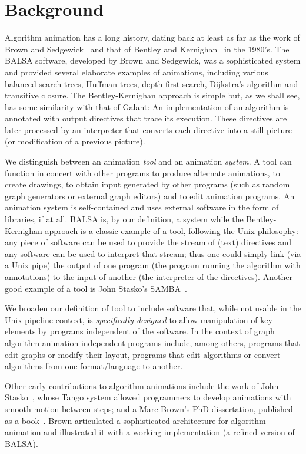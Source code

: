 \section{Background}\label{sec:background}

Algorithm animation has a long history, dating back at least as far as the
work of Brown and Sedgewick~\cite{1985-IEEE_Software-Brown,1988-Computer-Brown} and that of Bentley and Kernighan~\cite{1987-Animation-Bentley} in the 1980's.
The BALSA software, developed by Brown and Sedgewick, was a sophisticated system and provided several
elaborate examples of animations, including various balanced search trees,
Huffman trees, depth-first search, Dijkstra's algorithm and transitive closure.
The Bentley-Kernighan approach is simple but, as we shall see, has some similarity with that
of Galant: An implementation of an algorithm is annotated with output directives that trace its execution.
These directives are later processed by an interpreter that
converts each directive into a still picture (or modification of a previous
picture).

We distinguish between an animation \emph{tool}
and an animation \emph{system}.
A tool can function in concert with other programs to produce
alternate animations, to create drawings, to obtain input generated by other
programs (such as random graph generators or external graph editors) and to
edit animation programs.
An animation system is
self-contained and uses external software in the form of libraries, if at all.
BALSA is, by our definition, a system while the Bentley-Kernighan approach is a classic example of a tool, following the
Unix philosophy:
any piece of software can be used to provide the stream of (text) directives and any
software can be used to interpret that stream;
thus one could simply link (via a Unix pipe) the output of one program
(the program running the algorithm with annotations) to the
input of another (the interpreter of the directives).
Another good example of a tool is John Stasko's SAMBA~\cite{SAMBA}.

We broaden our definition of tool to include software that, while not usable
in the Unix pipeline context, is \emph{specifically designed} to allow manipulation
of key elements by programs independent of the software.
In the context of graph algorithm animation independent programs include,
among others, programs that edit graphs or modify their layout, programs that edit
algorithms or convert algorithms from one format/language to another. 

Other early contributions to algorithm animations include the work of
John Stasko~\cite{1990-Computer-Stasko}, whose Tango system allowed programmers to
develop animations with smooth motion between steps;
and a Marc Brown's PhD dissertation, published as a book~\cite{1988-Animation-Brown}. Brown articulated a sophisticated
architecture for algorithm animation and illustrated it with a working
implementation (a refined version of BALSA).

